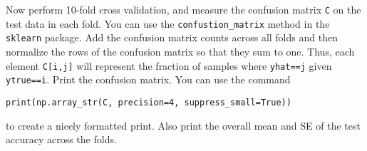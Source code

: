 \documentclass[11pt]{article}
\begin{document}
    Now perform 10-fold cross validation, and measure the confusion matrix
\texttt{C} on the test data in each fold. You can use the
\texttt{confustion\_matrix} method in the \texttt{sklearn} package. Add
the confusion matrix counts across all folds and then normalize the rows
of the confusion matrix so that they sum to one. Thus, each element
\texttt{C{[}i,j{]}} will represent the fraction of samples where
\texttt{yhat==j} given \texttt{ytrue==i}. Print the confusion matrix.
You can use the command

\begin{verbatim}
print(np.array_str(C, precision=4, suppress_small=True))
\end{verbatim}

to create a nicely formatted print. Also print the overall mean and SE
of the test accuracy across the folds.
\end{document}
